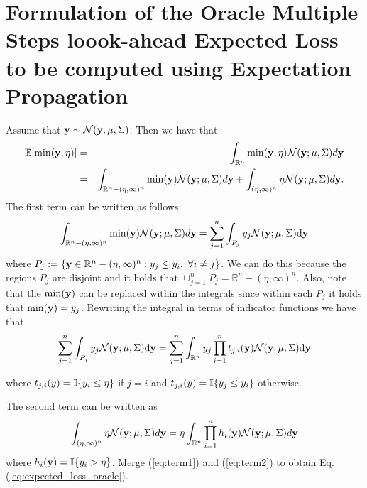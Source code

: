 \documentclass[twoside]{article}
\newcommand{\ud}{\mathrm{d}}
\newcommand{\E}{\mathbb{E}}
\newcommand{\N}{\mathcal{N}}
\newcommand{\IR}{\mathbb{R}}
\begin{document}
\section{Formulation of the Oracle Multiple Steps loook-ahead Expected Loss to be computed using Expectation Propagation}
Assume that $\dataVector \sim \N(\dataVector; \mu, \Sigma)$. Then we have that
\begin{eqnarray}\nonumber
\E[\min (\dataVector,\eta)] & = & \int_{\IR^n} \min (\dataVector,\eta)  \N(\dataVector; \mu, \Sigma) d\dataVector\\ \nonumber
& = & \int_{\IR^n - (\eta,\infty)^n } \min (\dataVector)  \N(\dataVector; \mu, \Sigma) d\dataVector + \int_{(\eta,\infty)^n} \eta  \N(\dataVector; \mu, \Sigma) d\dataVector.  \nonumber
\end{eqnarray}
The first term can be written as follows:
\begin{equation}
 \int_{\IR^n - (\eta,\infty)^n } \min (\dataVector)  \N(\dataVector; \mu, \Sigma) d\dataVector  =    \sum_{j=1}^n \int_{P_j} \dataScalar_j \N(\dataVector; \mu, \Sigma) \ud \dataVector \nonumber
\end{equation}\nonumber
where $P_j := \{ \dataVector \in\IR^n - (\eta,\infty)^n  : \dataScalar_j \leq \dataScalar_i,\,\, \forall i \neq j \}$. We can do this because the regions $P_j$ are disjoint and it holds that $\cup_{j=1}^{n}P_j = \IR^n - (\eta,\infty)^n $.  Also, note that the $\min(\mathbf{y})$ can be replaced within the integrals since within each $P_j$ it holds that $\min(\mathbf{y}) = y_j$. Rewriting the integral in terms of indicator functions we have that
\begin{eqnarray}\label{eq:term1}
 \sum_{j=1}^n \int_{P_j} \dataScalar_j \N(\dataVector; \mu, \Sigma) \ud \dataVector   =  \sum_{j=1}^n  \int_{\IR^n} \dataScalar_j \prod_{i=1}^n t_{j,i}(\dataVector) \N(\dataVector; \mu, \Sigma) \ud \dataVector 
\end{eqnarray}

where $t_{j,i}(y) =\mathbb{I}\{y_i \leq\eta\}$ if $j=i$ and $t_{j,i}(y) =\mathbb{I}\{y_j \leq y_i \}$ otherwise.

The second term can be written as
\begin{equation}\label{eq:term2}
 \int_{(\eta,\infty)^n } \eta  \N(\dataVector; \mu, \Sigma) d\dataVector = \eta\int_{\IR^n} \prod_{i=1}^nh_i(\dataVector) \N(\dataVector; \mu, \Sigma) d\dataVector
\end{equation}
where $h_i(\mathbf{y}) = \mathbb{I}\{y_i>\eta\}$.  Merge (\ref{eq:term1}) and (\ref{eq:term2}) to obtain Eq.  (\ref{eq:expected_loss_oracle}).
 
\end{document}

